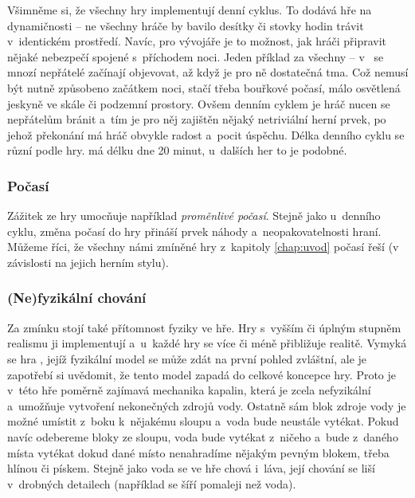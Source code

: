 Všimněme si, že všechny hry implementují denní cyklus. To dodává hře na dynamičnosti -- ne všechny hráče by bavilo desítky či stovky hodin trávit v~identickém prostředí. Navíc, pro vývojáře je to možnost, jak hráči připravit nějaké nebezpečí spojené s~příchodem noci. Jeden příklad za všechny -- v~ se mnozí nepřátelé začínají objevovat, až když je pro ně dostatečná tma. Což nemusí být nutně způsobeno začátkem noci, stačí třeba bouřkové počasí, málo osvětlená jeskyně ve skále či podzemní prostory. Ovšem denním cyklem je hráč nucen se nepřátelům bránit a~tím je pro něj zajištěn nějaký netriviální herní prvek, po jehož překonání má hráč obvykle radost a~pocit úspěchu.
Délka denního cyklu se různí podle hry. \MC{} má délku dne 20 minut, u~dalších her to je podobné.


\subsubsection{Počasí}
Zážitek ze hry umocňuje například \textit{proměnlivé počasí}. Stejně jako u~denního cyklu, změna počasí do hry přináší prvek náhody a~neopakovatelnosti hraní. Můžeme říci, že všechny námi zmíněné hry z~kapitoly \ref{chap:uvod} počasí řeší (v závislosti na jejich herním stylu). 

\subsubsection{(Ne)fyzikální chování}

Za zmínku stojí také přítomnost fyziky ve hře. Hry s~vyšším či úplným stupněm realismu ji implementují a~u~každé hry se více či méně přibližuje realitě. Vymyká se hra \MC{}, jejíž fyzikální model se může zdát na první pohled zvláštní, ale je zapotřebí si uvědomit, že tento model zapadá do celkové koncepce hry. Proto je v~této hře poměrně zajímavá mechanika kapalin, která je zcela nefyzikální a~umožňuje vytvoření nekonečných zdrojů vody. Ostatně sám blok zdroje vody je možné umístit z~boku k~nějakému sloupu a~voda bude neustále vytékat. Pokud navíc odebereme bloky ze sloupu, voda bude vytékat z~ničeho a~bude z~daného místa vytékat dokud dané místo nenahradíme nějakým pevným blokem, třeba hlínou či pískem. Stejně jako voda se ve hře chová i~láva, její chování se liší v~drobných detailech (například se šíří pomaleji než voda).

